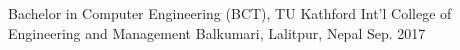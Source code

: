 
\begin{cventries}
  \cventry
    {Bachelor in Computer Engineering (BCT), TU} %
    {Kathford Int’l College of Engineering and Management} %
    {Balkumari, Lalitpur, Nepal} %
    {Sep. 2017} %
    {
    }
\end{cventries}
